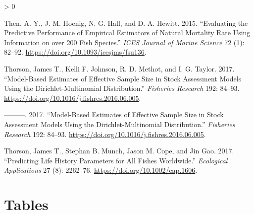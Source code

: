 \documentclass[11pt,
  english,
  a4paper,
]{article}
\newlength{\cslhangindent}
\newenvironment{CSLReferences}[2] %
 {%
  \setlength{\parindent}{0pt}
  \ifodd #1 \everypar{\setlength{\hangindent}{\cslhangindent}}\ignorespaces\fi
  \ifnum #2 > 0
  \setlength{\parskip}{#2\baselineskip}
  \fi
 }%
 {}
\begin{document}
\begin{CSLReferences}{1}{0}
\leavevmode\hypertarget{ref-then_evaluating_2015-1}{}%
Then, A. Y., J. M. Hoenig, N. G. Hall, and D. A. Hewitt. 2015. {``Evaluating the Predictive Performance of Empirical Estimators of Natural Mortality Rate Using Information on over 200 Fish Species.''} \emph{ICES Journal of Marine Science} 72 (1): 82--92. \url{https://doi.org/10.1093/icesjms/fsu136}.

\leavevmode\hypertarget{ref-thorson_model-based_2017}{}%
Thorson, James T., Kelli F. Johnson, R. D. Methot, and I. G. Taylor. 2017. {``Model-Based Estimates of Effective Sample Size in Stock Assessment Models Using the {Dirichlet}-Multinomial Distribution.''} \emph{Fisheries Research} 192: 84--93. \url{https://doi.org/10.1016/j.fishres.2016.06.005}.

\leavevmode\hypertarget{ref-thorson_model-based_2017}{}%
---------. 2017. {``Model-Based Estimates of Effective Sample Size in Stock Assessment Models Using the {Dirichlet}-Multinomial Distribution.''} \emph{Fisheries Research} 192: 84--93. \url{https://doi.org/10.1016/j.fishres.2016.06.005}.

\leavevmode\hypertarget{ref-thorson_predicting_2017}{}%
Thorson, James T., Stephan B. Munch, Jason M. Cope, and Jin Gao. 2017. {``Predicting Life History Parameters for All Fishes Worldwide.''} \emph{Ecological Applications} 27 (8): 2262--76. \url{https://doi.org/10.1002/eap.1606}.

\end{CSLReferences}

\leavevmode\tagmcend\tagstructend

\clearpage


\hypertarget{tables}{%
\section{Tables}\label{tables}}

\leavevmode\tagmcend\tagstructend



\newpage

\begingroup\fontsize{10}{12}\selectfont
\begingroup\fontsize{10}{12}\selectfont
\end{document}

